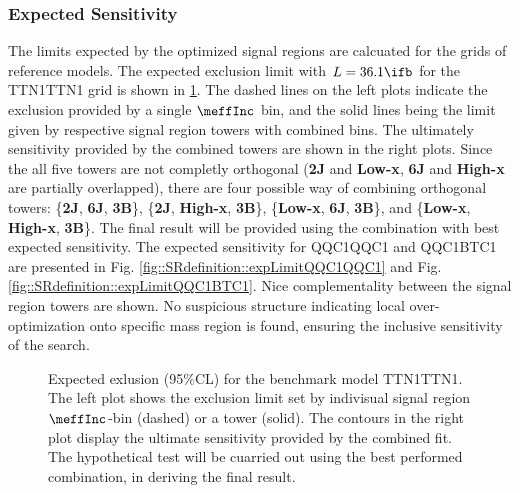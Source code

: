 \subsubsection{Expected Sensitivity}
The limits expected by the optimized signal regions are calcuated for the grids of reference models.
The expected exclusion limit with $L=36.1\ifb$ for the TTN1TTN1 \dire grid is shown in \ref{fig::SRdefinition::expLimitTTN1TTN1}. 
The dashed lines on the left plots indicate the exclusion provided by a single $\meffInc$ bin, and the solid lines being the limit given by respective signal region towers with combined bins. 
The ultimately sensitivity provided by the combined towers are shown in the right plots. 
Since the all five towers are not completly orthogonal (\textbf{2J} and \textbf{Low-x}, \textbf{6J} and \textbf{High-x} are partially overlapped), 
there are four possible way of combining orthogonal towers: \{\textbf{2J}, \textbf{6J}, \textbf{3B}\}, \{\textbf{2J}, \textbf{High-x}, \textbf{3B}\}, \{\textbf{Low-x}, \textbf{6J}, \textbf{3B}\}, and \{\textbf{Low-x}, \textbf{High-x}, \textbf{3B}\}.
The final result will be provided using the combination with best expected sensitivity. 
The expected sensitivity for QQC1QQC1 and QQC1BTC1 are presented in Fig. \ref{fig::SRdefinition::expLimitQQC1QQC1} and Fig. \ref{fig::SRdefinition::expLimitQQC1BTC1}. Nice complementality between the signal region towers are shown. No suspicious structure indicating local over-optimization onto specific mass region is found, ensuring the inclusive sensitivity of the search. 
\begin{figure}[h]
  \centering
    \caption{Expected exlusion (95$\%$CL) for the benchmark model TTN1TTN1. The left plot shows the exclusion limit set by indivisual signal region $\meffInc$-bin (dashed) or a tower (solid). The contours in the right plot display the ultimate sensitivity provided by the combined fit. The hypothetical test will be cuarried out using the best performed combination, in deriving the final result. }
    \label{fig::SRdefinition::expLimitTTN1TTN1}
\end{figure}


